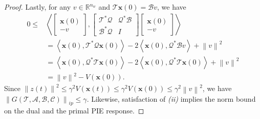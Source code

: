 \documentclass[letterpaper, 10 pt, conference]{ieeeconf}
\newcommand{\R}{\mathbb{R}}
\newcommand{\ip}[2]{\left\langle #1,#2\right\rangle}
\newcommand{\mcl}[1]{\mathcal{#1}}
\newcommand{\mbf}[1]{\mathbf{#1}}
\newcommand{\norm}[1]{\left\lVert #1 \right\rVert}
\newcommand{\bmat}[1]{\begin{bmatrix} #1 \end{bmatrix}}
\theoremstyle{definition}
\begin{document}
\begin{proof}
        Lastly, for any $v\in \R^{n_w}$ and $\mcl T\mbf x(0)=\mcl Bv$, we have
        \begin{align*}
            0\le &\ip{\bmat{\mbf x(0)\\-v}}{ \bmat{\mcl T^*\mcl Q&\mcl Q^*\mcl B\\\mcl B^*\mcl Q&I} \bmat{\mbf x(0)\\-v}} \\
            &= \ip{\mbf x(0)}{\mcl T^*\mcl Q\mbf x(0)} - 2\ip{\mbf x(0)}{\mcl Q^*\mcl Bv} + \norm{v}^2 \\
            &=\ip{\mbf x(0)}{\mcl Q^*\mcl T\mbf x(0)} - 2\ip{\mbf x(0)}{\mcl Q^*\mcl T\mbf x(0)} + \norm{v}^2 \\
            &= \norm{v}^2-V(\mbf x(0)).
        \end{align*}
        Since $\norm{z(t)}^2\le \gamma^2V(\mbf x(t))\le \gamma^2V(\mbf x(0))\le \gamma^2\norm{v}^2$, we have $\norm{G(\mcl T, \mcl A,\mcl B,\mcl C)}_{ip} \le \gamma$.
        Likewise, satisfaction of \textit{(ii)} implies the norm bound on the dual and the primal PIE response.
\end{proof}
\end{document}
